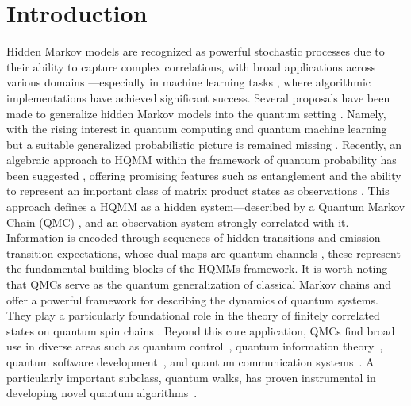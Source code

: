 \documentclass[12pt,a4paper]{article}
\begin{document}
\section{Introduction}
Hidden Markov models \cite{Rab2002} are recognized as powerful stochastic processes due to their ability to capture complex correlations, with broad applications across various domains \cite{Mor2021}—especially in machine learning tasks \cite{Li17}, where algorithmic implementations  \cite{V03, FV05} have achieved significant success.
Several proposals have been made to generalize hidden Markov models into the quantum setting  \cite{Monras11,  Srin2017, MRDFS22}.  Namely, with the rising interest in quantum computing and quantum machine learning \cite{Li2024} but  a suitable generalized probabilistic picture is remained missing \cite{FLW24}. Recently, an algebraic approach to  HQMM within the framework of quantum probability has been suggested \cite{AGLS24Q}, offering promising features such as entanglement \cite{Abd23} and the ability to represent an important class of matrix product states as observations \cite{Sou25}. This approach defines a  HQMM as %
a hidden system—described by a Quantum Markov Chain (QMC) \cite{accardi1974, ASS20}, and an observation system strongly correlated with it. Information is encoded through sequences of hidden transitions and emission transition expectations, whose  dual maps are quantum channels \cite{AccOhy99}, these represent the fundamental building blocks of the HQMMs framework.
It is worth noting that QMCs serve as the quantum generalization of classical Markov chains and offer a powerful framework for describing the dynamics of quantum systems. They play a particularly foundational role in the theory of finitely correlated states on quantum spin chains \cite{FNW92, fannes2, fannes3}. Beyond this core application, QMCs find broad use in diverse areas such as quantum control~\cite{ticozzi2008}, quantum information theory~\cite{guan2024}, quantum software development~\cite{ying2016}, and quantum communication systems~\cite{wolf2012}. A particularly important subclass, quantum walks, has proven instrumental in developing novel quantum algorithms~\cite{ambainis2003}.
\end{document}
